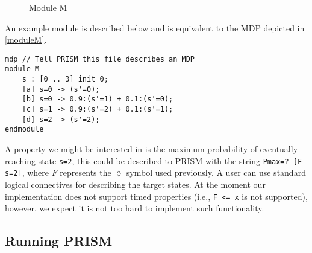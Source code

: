 \begin{figure}
\caption{Module M}
\label{moduleM}
\end{figure}

An example module is described below and is equivalent to the MDP
depicted in \autoref{moduleM}.

\smallskip
\begin{verbatim}
mdp // Tell PRISM this file describes an MDP
module M
    s : [0 .. 3] init 0;
    [a] s=0 -> (s'=0);
    [b] s=0 -> 0.9:(s'=1) + 0.1:(s'=0);
    [c] s=1 -> 0.9:(s'=2) + 0.1:(s'=1);
    [d] s=2 -> (s'=2);
endmodule
\end{verbatim}
\smallskip


A property we might be interested in is the maximum probability of
eventually reaching state \verb|s=2|, this could be described to PRISM
with the string \verb|Pmax=? [F s=2]|, where $F$ represents the
$\lozenge$ symbol used previously. A user can use standard logical
connectives for describing the target states. At the moment our
implementation does not support timed properties (i.e., \verb|F <= x| is not
supported), however, we expect it is not too hard to implement such
functionality.

\subsection*{Running PRISM}

